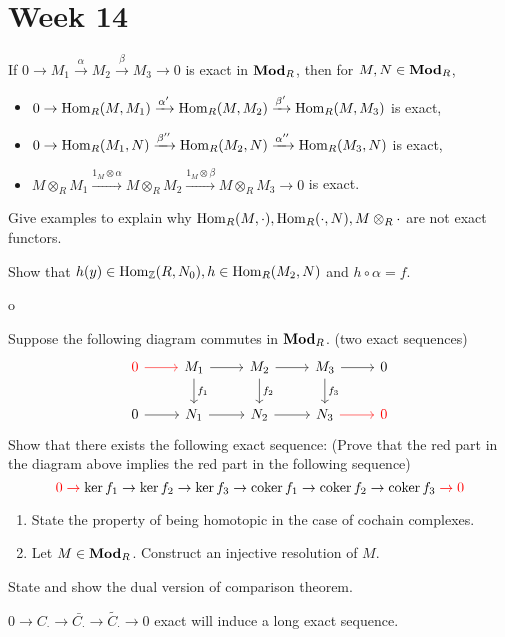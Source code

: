 
\section{Week 14}

\begin{exercise}
  If $0 \to M_1 \xrightarrow{\alpha} M_2 \xrightarrow{\beta} M_3 \to 0$
  is exact in $\mathbf{Mod}_R$, then for $M, N \in \mathbf{Mod}_R$,
  \begin{itemize}
    \item $0 \to \operatorname{Hom}_R(M, M_1) \xrightarrow{\alpha'}
      \operatorname{Hom}_R(M, M_2) \xrightarrow{\beta'} \operatorname{Hom}_R(M, M_3)$ is exact,
    \item $0 \to \operatorname{Hom}_R(M_1, N) \xrightarrow{\beta''}
      \operatorname{Hom}_R(M_2, N) \xrightarrow{\alpha''} \operatorname{Hom}_R(M_3, N)$ is exact,
    \item $M \otimes_R M_1 \xrightarrow{1_M \otimes \alpha}
      M\otimes_R M_2 \xrightarrow{1_M \otimes \beta} M\otimes_R M_3 \to 0$ is exact.
  \end{itemize}
\end{exercise}

\begin{exercise}
  Give examples to explain why $\operatorname{Hom}_R(M, \cdot), \operatorname{Hom}_R(\cdot, N), M\otimes_R \cdot$
  are not exact functors.
\end{exercise}

\begin{exercise}
  Show that $h(y) \in \operatorname{Hom}_{\mathbb{Z}}(R, N_0), h \in \operatorname{Hom}_R(M_2, N)$ and $h \circ \alpha = f$.
\end{exercise}
o
\begin{exercise}
  Suppose the following diagram commutes in $\mathbf{Mod}_R$.
  (two exact sequences)
  \[
    \begin{tikzcd}
      {\color{red} 0} \ar[r, red] & M_1 \ar[r] \ar[d, "f_1"]
      & M_2 \ar[r] \ar[d, "f_2"] & M_3 \ar[r] \ar[d, "f_3"] & 0 \\
      0 \ar[r] & N_1 \ar[r] & N_2 \ar[r] & N_3 \ar[r, red] & {\color{red} 0}
    \end{tikzcd}
  \]
  Show that there exists the following exact sequence:
  (Prove that the red part in the diagram above implies the red part in
  the following sequence)
  \[
    \mathcolor{red}{0 \to} \ker f_1 \to \ker f_2 \to \ker f_3
    \to \coker f_1 \to \coker f_2 \to \coker f_3 \mathcolor{red}{\to 0}
  \]
\end{exercise}

\begin{exercise} \mbox{}
  \begin{enumerate}[(1)]
    \item State the property of being homotopic in the case of cochain complexes.
    \item Let $M \in \mathbf{Mod}_R$. Construct an injective resolution of $M$.
  \end{enumerate}
\end{exercise}

\begin{exercise}
  State and show the dual version of comparison theorem.
\end{exercise}

\begin{exercise}
  $0 \to C_\cdot \to \bar{C_\cdot} \to \tilde{C_\cdot} \to 0$ exact
  will induce a long exact sequence.
\end{exercise}
